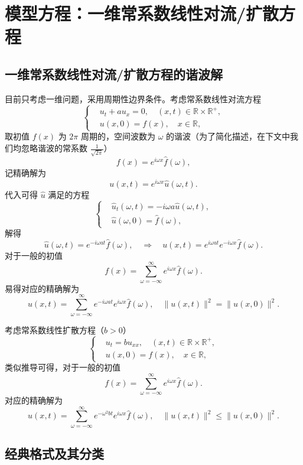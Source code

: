 \chapter{模型方程：一维常系数线性对流/扩散方程}

\section{一维常系数线性对流/扩散方程的谐波解}

目前只考虑一维问题，采用周期性边界条件。考虑常系数线性对流方程
\[
    \left\{
    \begin{aligned}
         & u_t + a u_x = 0, \quad (x,t) \in \mathbb{R} \times \mathbb{R}^+, \\
         & u(x,0) = f(x), \quad x \in \mathbb{R},
    \end{aligned}
    \right.
\]
取初值 $f(x)$ 为 $2\pi$ 周期的，空间波数为 $\omega$ 的谐波（为了简化描述，在下文中我们均忽略谐波的常系数 $\frac{1}{\sqrt{2\pi}}$）
\[
    f(x) = e^{i \omega x} \hat{f}(\omega),
\]
记精确解为
\[
    u(x,t) = e^{i \omega x} \hat{u}(\omega,t).
\]
代入可得 $\hat{u}$ 满足的方程
\[
    \left\{
    \begin{aligned}
         & \hat{u}_t(\omega,t) = -i \omega a \hat{u}(\omega,t), \\
         & \hat{u}(\omega,0) = \hat{f}(\omega),
    \end{aligned}
    \right.
\]
解得
\[
    \hat{u}(\omega,t) = e^{- i \omega a t} \hat{f}(\omega),
    \quad \Rightarrow \quad
    u(x,t) = e^{i \omega a t} e^{- i \omega x} \hat{f}(\omega).
\]
对于一般的初值
\[
    f(x) = \sum_{\omega = -\infty}^{\infty} e^{i \omega x} \hat{f}(\omega).
\]
易得对应的精确解为
\[
    u(x,t) = \sum_{\omega = -\infty}^{\infty} e^{- i \omega a t} e^{i \omega x} \hat{f}(\omega),
    \quad
    \| u(x,t) \|^2 = \|u(x,0)\|^2.
\]

考虑常系数线性扩散方程（$b > 0$）
\[
    \left\{
    \begin{aligned}
         & u_t = b u_{xx}, \quad (x,t) \in \mathbb{R} \times \mathbb{R}^+, \\
         & u(x,0) = f(x), \quad x \in \mathbb{R},
    \end{aligned}
    \right.
\]
类似推导可得，对于一般的初值
\[
    f(x) = \sum_{\omega = -\infty}^{\infty} e^{i \omega x} \hat{f}(\omega).
\]
对应的精确解为
\[
    u(x,t) = \sum_{\omega = -\infty}^{\infty} e^{- \omega^2 b t} e^{i \omega x} \hat{f}(\omega),
    \quad
    \| u(x,t) \|^2 \le \|u(x,0)\|^2.
\]


\section{经典格式及其分类}

